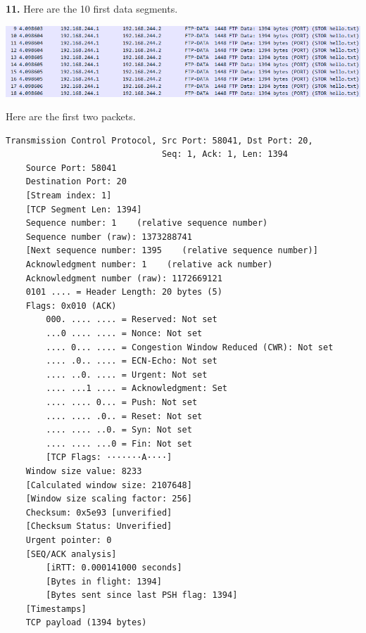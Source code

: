 \documentclass[12pt]{extarticle}
\begin{document}
\textbf{11.} Here are the 10 first data segments.
\begin{center}
\includegraphics[scale=0.6]{resources/5-4-1.png}
\end{center}
Here are the first two packets.
\begin{verbatim}
Transmission Control Protocol, Src Port: 58041, Dst Port: 20,
                               Seq: 1, Ack: 1, Len: 1394
    Source Port: 58041
    Destination Port: 20
    [Stream index: 1]
    [TCP Segment Len: 1394]
    Sequence number: 1    (relative sequence number)
    Sequence number (raw): 1373288741
    [Next sequence number: 1395    (relative sequence number)]
    Acknowledgment number: 1    (relative ack number)
    Acknowledgment number (raw): 1172669121
    0101 .... = Header Length: 20 bytes (5)
    Flags: 0x010 (ACK)
        000. .... .... = Reserved: Not set
        ...0 .... .... = Nonce: Not set
        .... 0... .... = Congestion Window Reduced (CWR): Not set
        .... .0.. .... = ECN-Echo: Not set
        .... ..0. .... = Urgent: Not set
        .... ...1 .... = Acknowledgment: Set
        .... .... 0... = Push: Not set
        .... .... .0.. = Reset: Not set
        .... .... ..0. = Syn: Not set
        .... .... ...0 = Fin: Not set
        [TCP Flags: ·······A····]
    Window size value: 8233
    [Calculated window size: 2107648]
    [Window size scaling factor: 256]
    Checksum: 0x5e93 [unverified]
    [Checksum Status: Unverified]
    Urgent pointer: 0
    [SEQ/ACK analysis]
        [iRTT: 0.000141000 seconds]
        [Bytes in flight: 1394]
        [Bytes sent since last PSH flag: 1394]
    [Timestamps]
    TCP payload (1394 bytes)
\end{verbatim}
\end{document}
